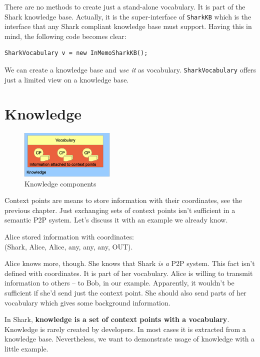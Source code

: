 There are no methods to create just a stand-alone vocabulary. It is part of the Shark knowledge base. Actually, it is the super-interface of {\tt SharkKB} which is the interface that any Shark compliant knowledge base must support.
Having this in mind, the following code becomes clear:

\begin{verbatim}
SharkVocabulary v = new InMemoSharkKB();
\end{verbatim}

We can create a knowledge base and {\it use it} as vocabulary. 
{\tt SharkVocabulary} offers just a limited view on a knowledge base.

\section{Knowledge}
\begin{figure}[t]
\centering
\includegraphics[width=0.40\textwidth]{knowledgecomponents.eps}
\caption{Knowledge components}
\label{fig:knowledgecomponents}
\end{figure}

Context points are means to store information with their coordinates, see the previous chapter. Just exchanging sets of context points isn't sufficient in a semantic P2P system. Let's discuss it with an example we already know.

Alice stored information with coordinates: \\
(Shark, Alice, Alice, any, any, any, OUT).

Alice knows more, though. She knows that Shark {\it is a} P2P system. This fact isn't defined with coordinates. It is part of her vocabulary. Alice is willing to transmit information to others -- to Bob, in our example. Apparently, it wouldn't be sufficient if she'd send just the context point. She should also send parts of her vocabulary which gives some background information.

In Shark, {\bf knowledge is a set of context points with a vocabulary}. Knowledge is rarely created by developers. In most cases it is extracted from a knowledge base. Nevertheless, we want to demonstrate usage of knowledge with a little example.


